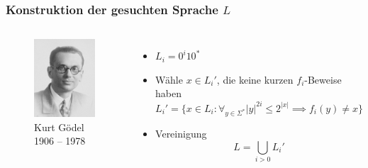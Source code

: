 \begin{frame}
  \frametitle{Konstruktion der gesuchten Sprache \(L\)}

  \begin{columns}
      \begin{figure}
        \includegraphics[width=\textwidth]{Presentation/Images/KurtGoedel.jpg}
        \caption{Kurt Gödel \\ 1906 -- 1978}
      \end{figure}

      \begin{itemize}
        \item<1-> \(L_i = 0^i10^*\)
        \item<2-> Wähle \(x \in L_i'\), die keine kurzen \(f_i\)-Beweise haben
                  \[L_i' = \{ x \in L_i : \forall_{y \in \Sigma^*} |y|^{2i} \leq 2^{|x|} \implies f_i(y) \neq x \}\]
        \item<3-> Vereinigung
                  \[L = \bigcup_{i>0} L_i' \]
      \end{itemize}
  \end{columns}
\end{frame}

